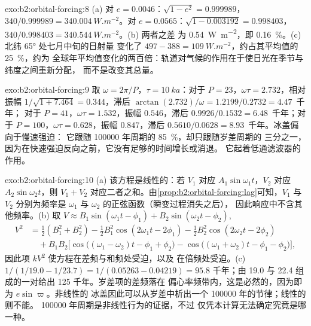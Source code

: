 \begin{solution}{exo:b2:orbital-forcing:8}
(a) 对 $e = 0.0046$：$\sqrt{1 - e^2} = 0.999989$，$340/0.999989 = \qty{340.004}{W.m^{-2}}$。对
$e = 0.0565$：$\sqrt{1 - 0.003192} = 0.998403$，$340/0.998403 = \qty{340.544}{W.m^{-2}}$。(b) 两者之差
为 \qty{0.54}{W.m^{-2}}，即 \qty{0.16}{\percent}。(c) 北纬 \ang{65} 处七月中旬的日射量
变化了 $497 - 388 = \qty{109}{W.m^{-2}}$，约占其平均值的 \qty{25}{\percent}，约为
全球年平均值变化的两百倍：轨道对气候的作用在于使日光在季节与纬度之间重新分配，
而不是改变其总量。
\end{solution}

\begin{solution}{exo:b2:orbital-forcing:9}
取 $\omega = 2\pi/P$，$\tau = \qty{10}{ka}$：对于 $P = 23$，$\omega\tau = 2.732$，相对振幅
$1/\sqrt{1 + 7.464} = 0.344$，滞后 $\arctan(2.732)/\omega = 1.2199/0.2732 = 4.47$~千年；
对于 $P = 41$，$\omega\tau = 1.532$，振幅 $0.546$，滞后 $0.9926/0.1532 = 6.48$~千年；对于 $P =
100$，$\omega\tau = 0.628$，振幅 $0.847$，滞后 $0.5610/0.0628 = 8.93$~千年。冰盖偏向于慢速强迫：
它跟随 \num{100000} 年周期的 \qty{85}{\percent}，却只跟随岁差周期的
三分之一，因为在快速强迫反向之前，它没有足够的时间增长或消退。
它起着低通滤波器的作用。
\end{solution}

\begin{solution}{exo:b2:orbital-forcing:10}
(a) 该方程是线性的：若 $V_1$ 对应 $A_1\sin\omega_1t$，$V_2$ 对应
$A_2\sin\omega_2t$，则 $V_1 + V_2$ 对应二者之和。由\cref{prop:b2:orbital-forcing:lag}可知，$V_1$ 与
$V_2$ 分别为频率是 $\omega_1$ 与 $\omega_2$ 的正弦函数（瞬变过程消失之后），
因此响应中不含其他频率。(b) 取 $V \approx B_1\sin(\omega_1t - \phi_1) +
B_2\sin(\omega_2t - \phi_2)$,
\[
\begin{aligned}
  V^2 &= \tfrac12(B_1^2 + B_2^2) - \tfrac12B_1^2\cos(2\omega_1t - 2\phi_1) -
  \tfrac12B_2^2\cos(2\omega_2t - 2\phi_2)\\
  &\quad + B_1B_2\bigl[\cos\bigl((\omega_1 - \omega_2)t - \phi_1 + \phi_2\bigr) -
  \cos\bigl((\omega_1 + \omega_2)t - \phi_1 - \phi_2\bigr)\bigr],
\end{aligned}
\]
因此项 $kV^2$ 使方程在差频与和频处受迫，以及
在倍频处受迫。(c) $1/(1/19.0 - 1/23.7) = 1/(0.05263 - 0.04219) = 95.8$ 千年；由 19.0
与 22.4 组成的一对给出 125 千年。岁差项的差频落在
偏心率频带内，这是必然的，因为即为 $e\sin\varpi$。非线性的
冰盖因此可以从岁差中析出一个 \num{100000} 年的节律；线性的则不能。
\num{100000} 年周期是非线性行为的证据，不过
仅凭本计算无法确定究竟是哪一种。
\end{solution}

